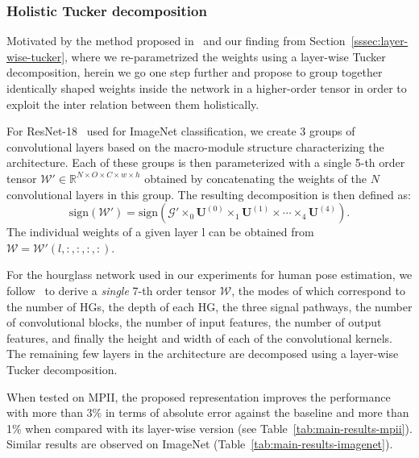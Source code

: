 \documentclass[10pt,twocolumn,letterpaper]{article}
\newcommand{\mytensor}[1]{\ensuremath{\mathcal{#1}}}
\newcommand{\mymatrix}[1]{\ensuremath{\mathbf{#1}}}
\begin{document}
\subsubsection{Holistic Tucker decomposition}\label{sssec:holistic-tucker}

Motivated by the method proposed in~\cite{kossaifi2018parametrizing} and our finding from Section~\ref{sssec:layer-wise-tucker}, where we re-parametrized the weights using a layer-wise Tucker decomposition, herein we go one step further and propose to group together identically shaped weights inside the network in a higher-order tensor in order to exploit the inter relation between them holistically. 





For ResNet-18~\cite{he2016deep} used for ImageNet classification, we create 3 groups of convolutional layers based on the macro-module structure characterizing the architecture. Each of these groups is then parameterized with a single 5-th order tensor $\mytensor{W'} \in  \mathbb{R}^{N \times O \times C \times w \times h}$ obtained by concatenating the weights of the $N$ convolutional layers in this group. The resulting decomposition is then defined as:
\begin{equation}
\text{sign}(\mytensor{W'}) = \text{sign}(\mytensor{G'} \times_0 \mymatrix{U}^{(0)} \times_1 \mymatrix{U}^{(1)} \times \cdots \times_4 \mymatrix{U}^{(4)}).
\label{eq:holistic}
\end{equation}
The individual weights of a given layer l can be obtained from $\mytensor{W} = \mytensor{W'}(l,:,:,:,:)$.

For the hourglass network used in our experiments for human pose estimation, we follow~\cite{kossaifi2018parametrizing} to derive  a \emph{single} 7-th  order tensor \mytensor{W}, the modes of which correspond to the number of HGs, the depth of each HG, the three signal pathways, the number of convolutional blocks, the number of input features, the number of output features, and finally the height and width of each of the convolutional kernels. The remaining few layers in the architecture are decomposed using a layer-wise Tucker decomposition. 

When tested on MPII, the proposed representation improves the performance with more than 3\% in terms of absolute error against the baseline and more than 1\% when compared with its layer-wise version (see Table~\ref{tab:main-results-mpii}). Similar results are observed on ImageNet (Table~\ref{tab:main-results-imagenet}).
\end{document}
